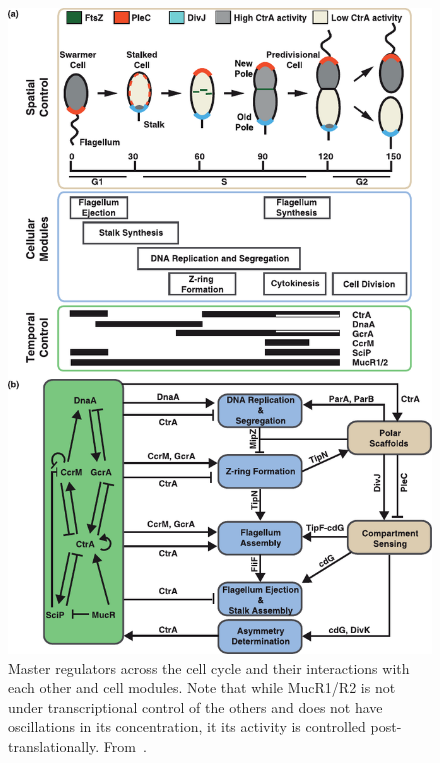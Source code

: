 \begin{figure}
    \centering
    \includegraphics{master-regulators}
    \caption{
        Master regulators across the cell cycle and their interactions with each other and cell modules.
        Note that while MucR1/R2 is not under transcriptional control of the others and does not have oscillations in its concentration, it its activity is controlled post-translationally.
        From~\cite{lasker2016}.
        \label{fig:master-regulators}
     }
\end{figure}

